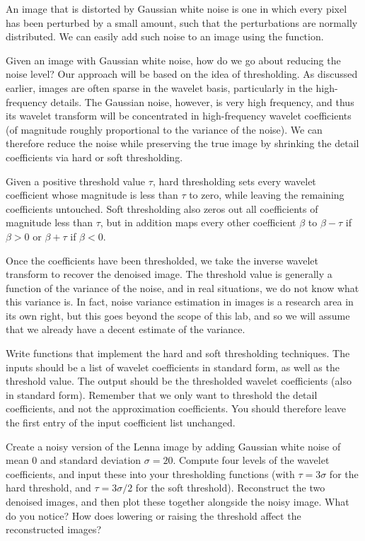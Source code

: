 An image that is distorted by Gaussian white noise is one in which
every pixel has been perturbed by a small amount, such that the
perturbations are normally distributed. We can easily add such noise
to an image using the  function.

Given an image with Gaussian white noise, how do we go about reducing
the noise level? Our approach will be based on the idea of thresholding.
As discussed earlier, images are often sparse in the wavelet basis,
particularly in the high-frequency details. The Gaussian noise, however,
is very high frequency, and thus its wavelet transform will be
concentrated in high-frequency wavelet coefficients (of magnitude
roughly proportional to the variance of the noise). We can therefore
reduce the noise while preserving the true image by shrinking the
detail coefficients via hard or soft thresholding.

Given a positive threshold value $\tau$, hard thresholding sets
every wavelet coefficient whose magnitude is less than $\tau$ to
zero, while leaving the remaining coefficients untouched. Soft
thresholding also zeros out all coefficients of magnitude less than
$\tau$, but in addition maps every other coefficient $\beta$ to
$\beta - \tau$ if $\beta > 0$ or $\beta + \tau$ if $\beta < 0$.

Once the coefficients have been thresholded, we take the inverse
wavelet transform to recover the denoised image. The threshold
value is generally a function of the variance of the noise,
and in real situations, we do not know what this variance is. In fact,
noise variance estimation in images is a research area in its own
right, but this goes beyond the scope of this lab, and so we will
assume that we already have a decent estimate of the variance.

\begin{problem}
Write functions that implement the hard and soft thresholding
techniques. The inputs should be a list of wavelet coefficients
in standard form, as well as the threshold value. The output
should be the thresholded wavelet coefficients (also in
standard form). Remember that we only want to threshold the
detail coefficients, and not the approximation coefficients.
You should therefore leave the first entry of the input
coefficient list unchanged.
\end{problem}
\begin{problem}
Create a noisy version of the Lenna image by adding Gaussian
white noise of mean 0 and standard deviation $\sigma = 20$. Compute four
levels of the wavelet coefficients, and input these into your
thresholding functions (with $\tau = 3\sigma$ for the hard threshold,
and $\tau = 3\sigma/2$ for the soft threshold). Reconstruct the
two denoised images, and then plot these together alongside the
noisy image. What do you notice? How does lowering or raising the
threshold affect the reconstructed images?
\end{problem}

